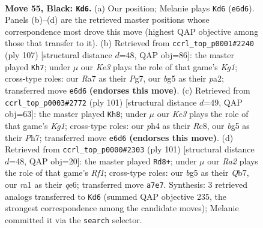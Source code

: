 \documentclass[11pt]{article}
\begin{document}
\clearpage

\begin{figure}[p]\centering
\begin{subfigure}{0.46\textwidth}\centering
\resizebox{\linewidth}{!}{%
\newchessgame
\chessboard[
  setfen={1qb1Q3/r7/4k3/p2p1pB1/P6P/8/8/RN4K1 b - - 1 55},
  showmover=false,
  pgfstyle=straightmove, color=movearrow, markmove={e6-d6}
]}
\caption{}
\end{subfigure}\hfill
\begin{subfigure}{0.46\textwidth}\centering
\resizebox{\linewidth}{!}{%
\newchessgame
\chessboard[
  setfen={4Q1k1/4b1p1/2p5/4q2P/p2p4/7K/P5P1/2B5 b - - 7 54},
  showmover=false,
  pgfstyle=straightmove, color=movearrow, markmove={g8-h7}
]}
\caption{}
\end{subfigure}
\\[4pt]
\begin{subfigure}{0.46\textwidth}\centering
\resizebox{\linewidth}{!}{%
\newchessgame
\chessboard[
  setfen={2r3k1/7p/b3P3/3q1pQ1/P2p3P/6P1/6RK/8 b - - 9 51},
  showmover=false,
  pgfstyle=straightmove, color=movearrow, markmove={g8-h8}
]}
\caption{}
\end{subfigure}\hfill
\begin{subfigure}{0.46\textwidth}\centering
\resizebox{\linewidth}{!}{%
\newchessgame
\chessboard[
  setfen={5r1k/1q5p/4Qb2/4p3/8/2P2R2/6PP/2NK4 b - - 1 51},
  showmover=false,
  pgfstyle=straightmove, color=movearrow, markmove={f8-d8}
]}
\caption{}
\end{subfigure}
\caption{\textbf{Move 55, Black: \texttt{Kd6}.} (a) Our position; Melanie plays \texttt{Kd6} (\texttt{e6d6}). Panels (b)--(d) are the retrieved master positions whose correspondence most drove this move (highest QAP objective among those that transfer to it). (b) Retrieved from \texttt{ccrl\_top\_p0001\#2240} (ply 107) [structural distance $d$=48, QAP obj=86]: the master played \texttt{Kh7}; under $\mu$ our \emph{Ke3} plays the role of that game's \emph{Kg1}; cross-type roles: our \emph{R}a7 as their \emph{P}g7, our \emph{b}g5 as their \emph{p}a2; transferred move \texttt{e6d6} \textbf{(endorses this move)}. (c) Retrieved from \texttt{ccrl\_top\_p0003\#2772} (ply 101) [structural distance $d$=49, QAP obj=63]: the master played \texttt{Kh8}; under $\mu$ our \emph{Ke3} plays the role of that game's \emph{Kg1}; cross-type roles: our \emph{p}h4 as their \emph{R}c8, our \emph{b}g5 as their \emph{P}h7; transferred move \texttt{e6d6} \textbf{(endorses this move)}. (d) Retrieved from \texttt{ccrl\_top\_p0000\#2303} (ply 101) [structural distance $d$=48, QAP obj=20]: the master played \texttt{Rd8+}; under $\mu$ our \emph{Ra2} plays the role of that game's \emph{Rf1}; cross-type roles: our \emph{b}g5 as their \emph{Q}b7, our \emph{r}a1 as their \emph{q}e6; transferred move \texttt{a7e7}. Synthesis: 3 retrieved analogs transferred to \texttt{Kd6} (summed QAP objective 235, the strongest correspondence among the candidate moves); Melanie committed it via the \texttt{search} selector.}
\label{fig:thought-m109}
\end{figure}
\end{document}
